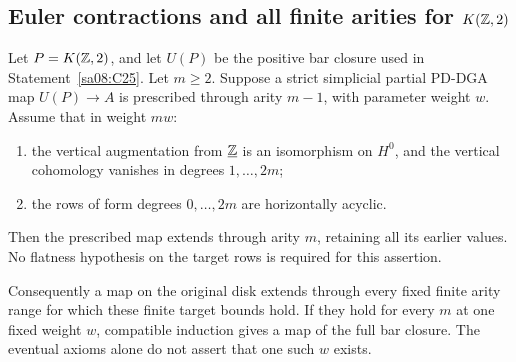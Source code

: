 \subsection{Euler contractions and all finite arities for \texorpdfstring{$K(\mathbb Z,2)$}{K(Z,2)}}

\begin{theorem}
\label{sa08:C27}
Let $P=K(\mathbb Z,2)$, and let $U(P)$ be the positive
bar closure used in Statement~\ref{sa08:C25}.
Let $m\geq2$. Suppose a strict simplicial partial
PD-DGA map $U(P)\to A$ is prescribed through
arity $m-1$, with parameter weight $w$.
Assume that in weight $mw$:
\begin{enumerate}
\item the vertical augmentation from
$\underline{\mathbb Z}$ is an isomorphism on $H^0$,
and the vertical cohomology vanishes in
degrees $1,\ldots,2m$;
\item the rows of form degrees $0,\ldots,2m$
are horizontally acyclic.
\end{enumerate}
Then the prescribed map extends through
arity $m$, retaining all its earlier values.
No flatness hypothesis on the target rows
is required for this assertion.

Consequently a map on the original disk
extends through every fixed finite arity
range for which these finite target bounds
hold. If they hold for every $m$ at one
fixed weight $w$, compatible induction
gives a map of the full bar closure.
The eventual axioms alone do not assert
that one such $w$ exists.
\end{theorem}
